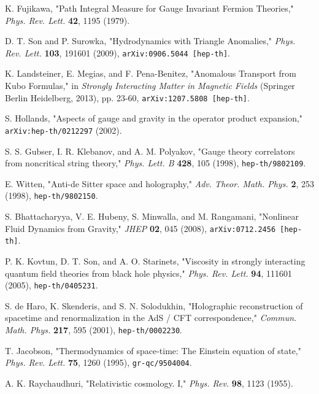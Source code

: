 \documentclass[11pt, letterpaper]{report}
\theoremstyle{plain} %
\theoremstyle{definition} %
\theoremstyle{remark} %
\begin{document}
\begin{thebibliography}{99}
K. Fujikawa, "Path Integral Measure for Gauge Invariant Fermion Theories," \textit{Phys. Rev. Lett.} \textbf{42}, 1195 (1979).

D. T. Son and P. Surowka, "Hydrodynamics with Triangle Anomalies," \textit{Phys. Rev. Lett.} \textbf{103}, 191601 (2009), \texttt{arXiv:0906.5044 [hep-th]}.

K. Landsteiner, E. Megias, and F. Pena-Benitez, "Anomalous Transport from Kubo Formulas," in \textit{Strongly Interacting Matter in Magnetic Fields} (Springer Berlin Heidelberg, 2013), pp. 23-60, \texttt{arXiv:1207.5808 [hep-th]}.

\label{Hollands2002Aspects}
S. Hollands, "Aspects of gauge and gravity in the operator product expansion," \texttt{arXiv:hep-th/0212297} (2002).

S. S. Gubser, I. R. Klebanov, and A. M. Polyakov, "Gauge theory correlators from noncritical string theory," \textit{Phys. Lett. B} \textbf{428}, 105 (1998), \texttt{hep-th/9802109}.

E. Witten, "Anti-de Sitter space and holography," \textit{Adv. Theor. Math. Phys.} \textbf{2}, 253 (1998), \texttt{hep-th/9802150}.

S. Bhattacharyya, V. E. Hubeny, S. Minwalla, and M. Rangamani, "Nonlinear Fluid Dynamics from Gravity," \textit{JHEP} \textbf{02}, 045 (2008), \texttt{arXiv:0712.2456 [hep-th]}.

P. K. Kovtun, D. T. Son, and A. O. Starinets, "Viscosity in strongly interacting quantum field theories from black hole physics," \textit{Phys. Rev. Lett.} \textbf{94}, 111601 (2005), \texttt{hep-th/0405231}.

S. de Haro, K. Skenderis, and S. N. Solodukhin, "Holographic reconstruction of spacetime and renormalization in the AdS / CFT correspondence," \textit{Commun. Math. Phys.} \textbf{217}, 595 (2001), \texttt{hep-th/0002230}.

T. Jacobson, "Thermodynamics of space-time: The Einstein equation of state," \textit{Phys. Rev. Lett.} \textbf{75}, 1260 (1995), \texttt{gr-qc/9504004}.

A. K. Raychaudhuri, "Relativistic cosmology. I," \textit{Phys. Rev.} \textbf{98}, 1123 (1955).


\end{thebibliography}
\end{document}
